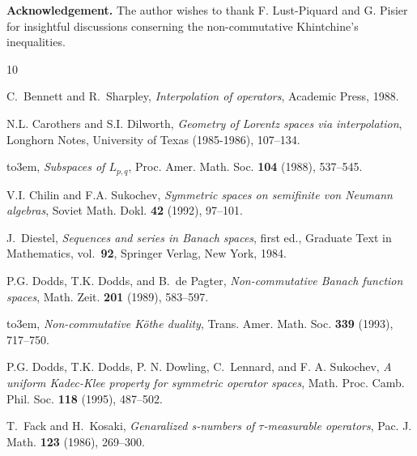 \documentclass[12pt]{amsart}
\numberwithin{equation}{section}
\numberwithin{theorem}{section}
\begin{document}
 

\bigskip










\medskip

\noindent
{\bf Acknowledgement.} The author wishes to thank  F. Lust-Piquard and
G. Pisier for insightful discussions conserning the non-commutative
Khintchine's inequalities.  

 
%
%


\providecommand{\bysame}{\leavevmode\hbox to3em{\hrulefill}\thinspace}
\begin{thebibliography}{10}

C.~Bennett and R.~Sharpley, \emph{{\it Interpolation of operators}}, Academic
  Press, 1988.

N.L. Carothers and S.I. Dilworth, \emph{{\it Geometry of Lorentz spaces via
  interpolation}}, {\rm Longhorn Notes, University of Texas} \textbf{{\bf }}
  (1985-1986), 107--134.

\bysame, \emph{{\it Subspaces of $L_{p,q}$}}, {\rm Proc. Amer. Math. Soc.}
  \textbf{{\bf 104}} (1988), 537--545.

V.I. Chilin and F.A. Sukochev, \emph{{\it Symmetric spaces on semifinite von
  Neumann algebras}}, {\rm Soviet Math. Dokl.} \textbf{{\bf 42}} (1992),
  97--101.

J.~Diestel, \emph{{\it Sequences and series in Banach spaces}}, first ed., {\rm
  Graduate Text in Mathematics}, vol.~{\bf 92}, Springer Verlag, New York,
  1984.

P.G. Dodds, T.K. Dodds, and B.~{de Pagter}, \emph{{\it Non-commutative Banach
  function spaces}}, {\rm Math. Zeit.} \textbf{{\bf 201}} (1989), 583--597.

\bysame, \emph{{\it Non-commutative K\"othe duality}}, {\rm Trans. Amer. Math.
  Soc.} \textbf{{\bf 339}} (1993), 717--750.

P.G. Dodds, T.K. Dodds, {P. N.} Dowling, C.~Lennard, and {F. A.} Sukochev,
  \emph{{\it A uniform Kadec-Klee property for symmetric operator spaces}},
  {\rm Math. Proc. Camb. Phil. Soc.} \textbf{{\bf 118}} (1995), 487--502.

T.~Fack and H.~Kosaki, \emph{{\it Genaralized s-numbers of $\tau$-measurable
  operators}}, {\rm Pac. J. Math.} \textbf{{\bf 123}} (1986), 269--300.


\end{thebibliography}
\end{document}

